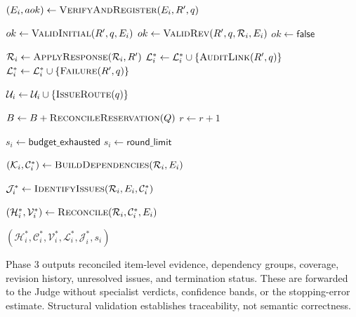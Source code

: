 \begin{algorithm}[!t]
\begin{algorithmic}[1]
        \State $(E_i,aok)\gets
        \Call{VerifyAndRegister}{
        E_i,R',q}$

                \State $ok\gets
                \Call{ValidInitial}{R',q,E_i}$
            \Else
                \State $ok\gets
                \Call{ValidRev}{
                R',q,\mathcal R_i,E_i}$
            \EndIf
        \Else
            \State $ok\gets\mathsf{false}$
        \EndIf

            \State $\mathcal R_i\gets
            \Call{ApplyResponse}{
            \mathcal R_i,R'}$
            \State $\mathcal L_i^*\gets
            \mathcal L_i^*\cup
            \{\Call{AuditLink}{R',q}\}$
        \Else
            \State $\mathcal L_i^*\gets
            \mathcal L_i^*\cup
            \{\Call{Failure}{R',q}\}$
        \EndIf

        \State $\mathcal U_i\gets
        \mathcal U_i\cup
        \{\Call{IssueRoute}{q}\}$
    \EndFor

    \State $B\gets B+
    \Call{ReconcileReservation}{Q}$
    \State $r\gets r+1$

\EndWhile

        \State $s_i\gets\mathsf{budget\_exhausted}$
    \Else
        \State $s_i\gets\mathsf{round\_limit}$
    \EndIf
\EndIf

\State $(\mathcal K_i,\mathcal C_i^*)
\gets\Call{BuildDependencies}{\mathcal R_i,E_i}$

\State $\mathcal J_i^*\gets
\Call{IdentifyIssues}{
\mathcal R_i,E_i,\mathcal C_i^*}$

\State $(\mathcal H_i^*,\mathcal V_i^*)
\gets\Call{Reconcile}{
\mathcal R_i,\mathcal C_i^*,E_i}$

\State \Return
$(\mathcal H_i^*,\mathcal C_i^*,
\mathcal V_i^*,\mathcal L_i^*,
\mathcal J_i^*,s_i)$

\end{algorithmic}
\end{algorithm}


Phase 3 outputs reconciled item-level
evidence, dependency groups, coverage,
revision history, unresolved issues,
and termination status. These are
forwarded to the Judge without
specialist verdicts, confidence bands,
or the stopping-error estimate.
Structural validation establishes
traceability, not semantic correctness.





